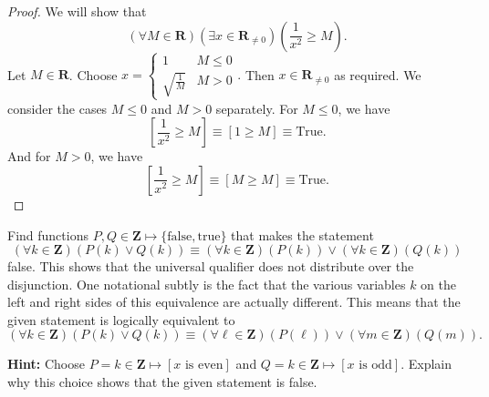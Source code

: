 \documentclass[12pt,fleqn,answers]{exam}
\newcommand{\reals}{\mathbf{R}}
\newcommand{\integers}{\mathbf{Z}}
\renewenvironment{solution}
  {\begin{shaded*}} %
  {\end{shaded*}}   %
\begin{document}
\begin{questions}
\begin{solution}
  \begin{proof} We will show that
    \begin{equation*}
      \left(\forall M \in \reals\right)
      \left(\exists x \in \reals_{\neq 0} \right)
      \left(\frac{1}{x^2} \geq  M \right).
    \end{equation*}
  Let $M \in \reals$. Choose $x = 
    \begin{cases} 1 & M \leq 0 \\ \sqrt{\frac{1}{M}} & M > 0 
    \end{cases}.$ Then $x  \in \reals_{\neq 0}$ as required.
    We consider the cases $M \leq 0$ and $M > 0$ separately.
    For $M \leq 0$, we have
    \begin{equation*}
      \left[\frac{1}{x^2} \geq  M \right] \equiv \left[1 \geq M \right]
      \equiv \text{True}.
    \end{equation*}
    And for $M > 0$, we have
    \begin{equation*}
      \left[\frac{1}{x^2} \geq  M \right] \equiv 
      \left[M \geq M \right]
      \equiv \text{True}.
    \end{equation*}
  \end{proof}
\end{solution}


 
\question [10] Find functions $P,Q \in \integers \mapsto \{\mbox{false}, \mbox{true}\}$ that makes
the statement
\begin{equation*}
  \left(\forall k \in \integers\right) \left (P(k) \lor Q(k) \right) \equiv 
  \left(\forall k \in \integers\right) \left (P(k) \right)  \lor 
  \left(\forall k \in \integers\right) \left (Q(k) \right)  
\end{equation*}
false.  This shows that the universal qualifier does not distribute over 
the disjunction. One notational subtly is the fact that the various
variables $k$ on the left and right sides of this equivalence are
actually different.  This means that the given statement is logically
equivalent to 
\begin{equation*}
  \left(\forall k \in \integers\right) \left (P(k) \lor Q(k) \right) \equiv 
  \left(\forall \ell \in \integers\right) \left (P(\ell) \right)  \lor 
  \left(\forall m \in \integers\right) \left (Q(m) \right).  
\end{equation*}


\textbf{Hint:} Choose $P = k \in \integers \mapsto \left[x \mbox{ is even}\right]$
and $Q = k \in \integers \mapsto \left[x \mbox{ is odd}\right]$. Explain why this choice
shows that the given statement is false.


\end{questions}
\end{document}
